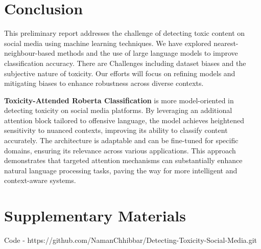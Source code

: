 \section{Conclusion}

This preliminary report addresses the challenge of detecting toxic content on social media using machine learning techniques. We have explored nearest-neighbour-based methods and the use of large language models to improve classification accuracy. There are Challenges including dataset biases and the subjective nature of toxicity. 
Our efforts will focus on refining models and mitigating biases to enhance robustness across diverse contexts.

\textbf{Toxicity-Attended Roberta Classification} is more model-oriented in detecting toxicity on social media platforms. By leveraging an additional attention block tailored to offensive language, the model achieves heightened sensitivity to nuanced contexts, improving its ability to classify content accurately. The architecture is adaptable and can be fine-tuned for specific domains, ensuring its relevance across various applications.
This approach demonstrates that targeted attention mechanisms can substantially enhance natural language processing tasks, paving the way for more intelligent and context-aware systems.


\section{Supplementary Materials}
Code - https://github.com/NamanChhibbar/Detecting-Toxicity-Social-Media.git
